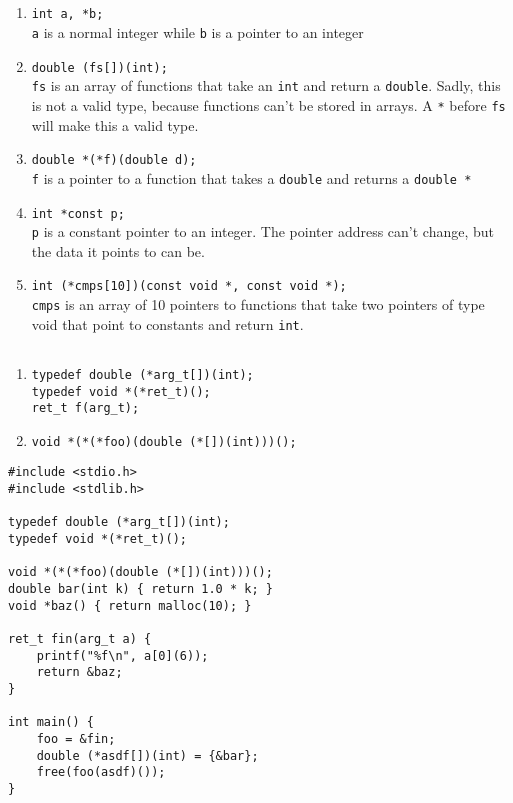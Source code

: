 \documentclass[a4paper,11pt]{article}
\def\code#1{\texttt{#1}}
\begin{document}
\subsection{}
\begin{enumerate}[label = (\alph*)]
  \item \code{int a, *b;}\\
    \code{a} is a normal integer while \code{b} is a pointer to an integer
  \item \code{double (fs[])(int);}\\
    \code{fs} is an array of functions that take an \code{int} and return a \code{double}.
    Sadly, this is not a valid type, because functions can't be stored in arrays.
    A \code{*} before \code{fs} will make this a valid type.
  \item \code{double *(*f)(double d);}\\
    \code{f} is a pointer to a function that takes a \code{double} and returns a \code{double *}
  \item \code{int *const p;}\\
    \code{p} is a constant pointer to an integer.
    The pointer address can't change, but the data it points to can be.
  \item \code{int (*cmps[10])(const void *, const void *);}\\
    \code{cmps} is an array of 10 pointers to functions that take two pointers of type void that point to constants and return \code{int}.
\end{enumerate}

\subsection{}
\begin{enumerate}[label = (\alph*)]
  \item\code{typedef double (*arg\_t[])(int);\\
  typedef void *(*ret\_t)();\\
  ret\_t f(arg\_t);}
  \item\code{void *(*(*foo)(double (*[])(int)))();}
\end{enumerate}

\begin{lstlisting}[caption=Function Pointers,label=function pointers]
#include <stdio.h>
#include <stdlib.h>

typedef double (*arg_t[])(int);
typedef void *(*ret_t)();

void *(*(*foo)(double (*[])(int)))();
double bar(int k) { return 1.0 * k; }
void *baz() { return malloc(10); }

ret_t fin(arg_t a) {
    printf("%f\n", a[0](6));
    return &baz;
}

int main() {
    foo = &fin;
    double (*asdf[])(int) = {&bar};
    free(foo(asdf)());
}
\end{lstlisting}
\end{document}
